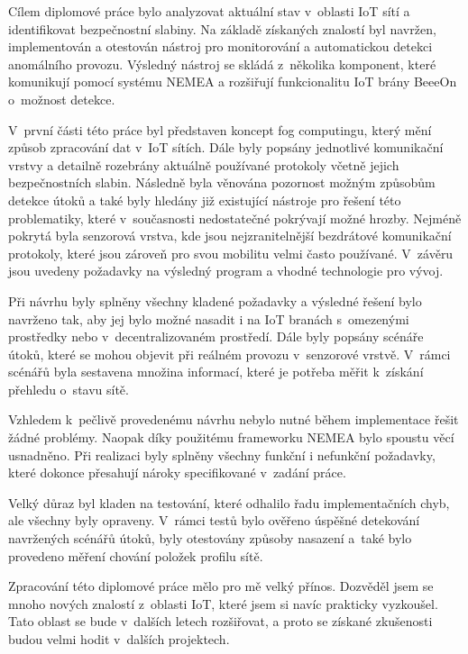 \documentclass[thesis=M,czech]{FITthesis}[2012/06/26]
\begin{document}
\begin{conclusion}

Cílem diplomové práce bylo analyzovat aktuální stav v~oblasti IoT sítí a identifikovat bezpečnostní 
slabiny. Na základě získaných znalostí byl navržen,
implementován a otestován nástroj
pro monitorování a automatickou detekci anomálního provozu. Výsledný nástroj se skládá z~několika
komponent, které komunikují pomocí systému NEMEA a rozšiřují funkcionalitu IoT brány BeeeOn
o~možnost detekce. 

V~první části této práce byl představen koncept fog computingu, který mění 
způsob zpracování dat v~IoT sítích. Dále byly popsány jednotlivé komunikační vrstvy a detailně rozebrány
aktuálně používané protokoly včetně jejich bezpečnostních slabin. Následně byla věnována 
pozornost možným způsobům detekce útoků a také byly hledány již existující nástroje 
pro řešení této 
problematiky, které v~současnosti nedostatečné pokrývají možné hrozby. Nejméně pokrytá byla 
senzorová vrstva, kde jsou nejzranitelnější bezdrátové komunikační protokoly, které jsou zároveň 
pro svou mobilitu velmi často používané.
V~závěru jsou uvedeny
požadavky na výsledný program a vhodné technologie pro vývoj.

Při návrhu byly splněny všechny kladené požadavky a výsledné řešení bylo navrženo tak, aby jej 
bylo možné nasadit i na IoT branách s~omezenými prostředky nebo v~decentralizovaném prostředí. 
Dále byly popsány scénáře útoků, které se mohou objevit při reálném provozu v~senzorové vrstvě.
V~rámci scénářů byla sestavena množina informací, které je potřeba měřit k~získání přehledu
o~stavu sítě. 

Vzhledem k~pečlivě provedenému návrhu nebylo nutné během implementace řešit žádné problémy. Naopak
díky použitému frameworku NEMEA bylo spoustu věcí usnadněno. Při 
realizaci byly splněny všechny funkční i nefunkční požadavky, které dokonce přesahují nároky 
specifikované v~zadání práce.

Velký důraz byl kladen na testování, které odhalilo řadu implementačních chyb, ale všechny byly
opraveny. V~rámci testů bylo ověřeno úspěšné detekování navržených scénářů útoků, byly
otestovány způsoby nasazení a~také bylo provedeno měření chování položek profilu sítě.

Zpracování této diplomové práce mělo pro mě velký přínos. Dozvěděl jsem se mnoho nových znalostí 
z~oblasti IoT, které jsem si navíc prakticky vyzkoušel. Tato oblast se bude v~dalších
letech rozšiřovat, a proto se získané zkušenosti budou velmi hodit v~dalších projektech.


\end{conclusion}
\end{document}
